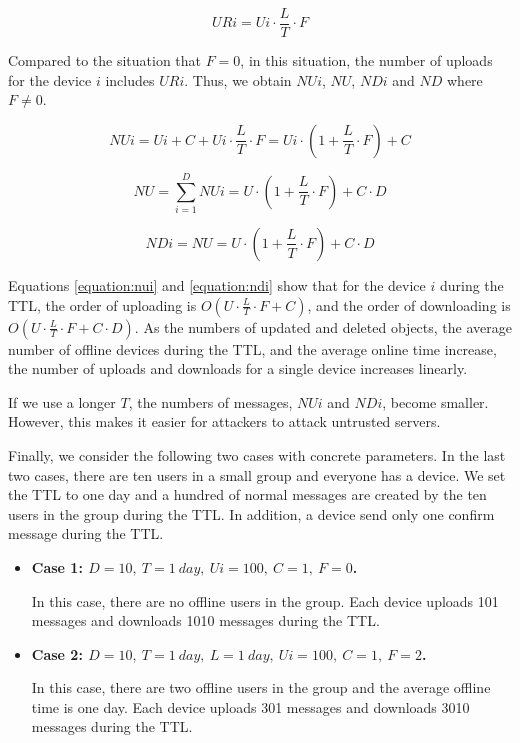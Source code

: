 \documentclass[a4paper,11pt]{report}
\begin{document}
\begin{equation}
URi = Ui \cdot \frac{L}{T} \cdot F
\label{equation:uri}
\end{equation}

Compared to the situation that $F=0$, in this situation, the number of uploads for the device $i$ includes $URi$.
Thus, we obtain $NUi$, $NU$, $NDi$ and $ND$ where $F \neq 0$.

\begin{equation}
NUi = Ui + C + Ui \cdot \frac{L}{T} \cdot F = Ui \cdot (1 + \frac{L}{T} \cdot F) + C
\label{equation:nui}
\end{equation}

\begin{equation}
NU = \sum_{i = 1}^{D} NUi = U \cdot (1 + \frac{L}{T} \cdot F) + C \cdot D
\label{equation:nu}
\end{equation}

\begin{equation}
NDi = NU = U \cdot (1 + \frac{L}{T} \cdot F) + C \cdot D
\label{equation:ndi}
\end{equation}

Equations \ref{equation:nui} and \ref{equation:ndi} show that for the device $i$ during the TTL, the order of uploading is $O(U \cdot \frac{L}{T} \cdot F + C)$, and the order of downloading is $O(U \cdot \frac{L}{T} \cdot F + C \cdot D)$.
As the numbers of updated and deleted objects, the average number of offline devices during the TTL, and the average online time increase, the number of uploads and downloads for a single device increases linearly.

If we use a longer $T$, the numbers of messages, $NUi$ and $NDi$, become smaller.
However, this makes it easier for attackers to attack untrusted servers.

Finally, we consider the following two cases with concrete parameters.
In the last two cases, there are ten users in a small group and everyone has a device.
We set the TTL to one day and a hundred of normal messages are created by the ten users in the group during the TTL.
In addition, a device send only one confirm message during the TTL.

\begin{itemize}[leftmargin=7mm]
	\setlength{\itemsep}{1pt}
	\setlength{\parskip}{0pt}
	\setlength{\parsep}{0pt}
	\item \textbf{Case 1: $D = 10,\ T = 1 \ day,\ Ui = 100,\ C = 1,\ F = 0$.}
	
	In this case, there are no offline users in the group.
	Each device uploads 101 messages and downloads 1010 messages during the TTL.
	\item \textbf{Case 2: $D = 10,\ T = 1 \ day,\ L = 1 \  day,\ Ui = 100,\ C = 1,\ F = 2$.} 
	
	In this case, there are two offline users in the group and the average offline time is one day.
	Each device uploads 301 messages and downloads 3010 messages during the TTL.
\end{itemize}
\end{document}
